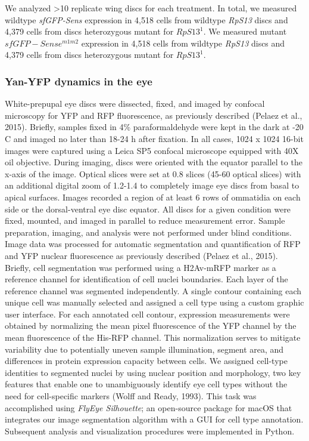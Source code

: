 We analyzed \textgreater{}10 replicate wing discs for each treatment. In total, we measured wildtype \textit{sfGFP-Sens} expression in 4,518 cells from wildtype \textit{RpS13} discs and 4,379 cells from discs heterozygous mutant for $RpS13^1$. We measured mutant $sfGFP-Sense^{m1m2}$ expression in 4,518 cells from wildtype \textit{RpS13} discs and 4,379 cells from discs heterozygous mutant for $RpS13^1$.

\subsubsection{Yan-YFP dynamics in the eye}
\label{appendix:methods:metabolism:yan}

White-prepupal eye discs were dissected, fixed, and imaged by confocal microscopy for YFP and RFP fluorescence, as previously described (Pelaez et al., 2015). Briefly, samples fixed in 4\% paraformaldehyde were kept in the dark at -20 \textdegree{}C and imaged no later than 18-24 h after fixation. In all cases, 1024 x 1024 16-bit images were captured using a Leica SP5 confocal microscope equipped with 40X oil objective. During imaging, discs were oriented with the equator parallel to the x-axis of the image. Optical slices were set at 0.8 \mum slices (45-60 optical slices) with an additional digital zoom of 1.2-1.4 to completely image eye discs from basal to apical surfaces. Images recorded a region of at least 6 rows of ommatidia on each side or the dorsal-ventral eye disc equator. All discs for a given condition were fixed, mounted, and imaged in parallel to reduce measurement error. Sample preparation, imaging, and analysis were not performed under blind conditions. Image data was processed for automatic segmentation and quantification of RFP and YFP nuclear fluorescence as previously described (Pelaez et al., 2015). Briefly, cell segmentation was performed using a H2Av-mRFP marker as a reference channel for identification of cell nuclei boundaries. Each layer of the reference channel was segmented independently. A single contour containing each unique cell was manually selected and assigned a cell type using a custom graphic user interface. For each annotated cell contour, expression measurements were obtained by normalizing the mean pixel fluorescence of the YFP channel by the mean fluorescence of the His-RFP channel. This normalization serves to mitigate variability due to potentially uneven sample illumination, segment area, and differences in protein expression capacity between cells. We assigned cell-type identities to segmented nuclei by using nuclear position and morphology, two key features that enable one to unambiguously identify eye cell types without the need for cell-specific markers (Wolff and Ready, 1993). This task was accomplished using \textit{FlyEye Silhouette}; an open-source package for macOS that integrates our image segmentation algorithm with a GUI for cell type annotation. Subsequent analysis and visualization procedures were implemented in Python.

